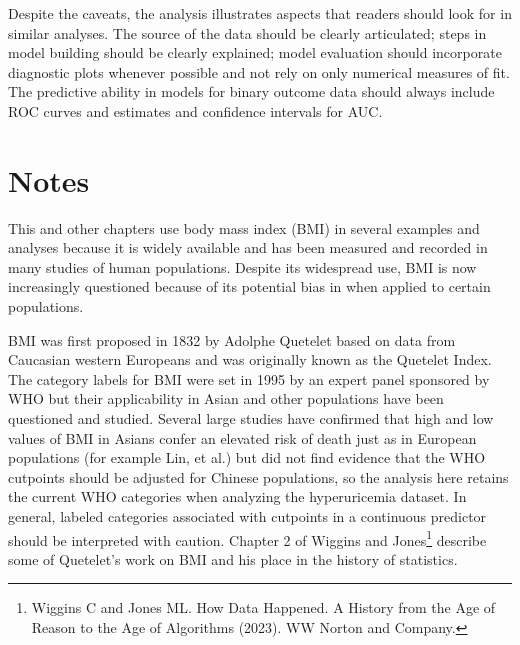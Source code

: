 Despite the caveats, the analysis illustrates aspects that readers should look for in similar analyses. The source of the data should be clearly articulated; steps in model building should be clearly explained; model evaluation should incorporate diagnostic plots whenever  possible and not rely on only numerical  measures of fit.  The predictive ability in models for binary outcome data should always include ROC curves and estimates and confidence intervals for AUC.

\textD{\newpage}

\section{Notes}
\label{notesLogisticRegression}

This and other chapters use body mass index (BMI) in several examples and analyses because it is widely available and has been measured and recorded in many studies of human populations. Despite its widespread use, BMI is now increasingly questioned because of its potential bias in when applied to certain populations.

BMI was first proposed in 1832 by Adolphe Quetelet based on data from Caucasian western Europeans and was originally known as the Quetelet Index. The category labels for BMI were set in 1995 by an expert panel sponsored by WHO but their applicability in Asian and other populations have been questioned and studied.  Several large studies have confirmed that high and low values of BMI in Asians confer an elevated risk of death just as in European populations (for example Lin, et al.) but did not find evidence that the WHO cutpoints should be adjusted for Chinese populations, so the analysis here retains the current WHO categories when analyzing the hyperuricemia dataset.  In general, labeled categories associated with cutpoints in a continuous predictor should be interpreted with caution.  Chapter 2 of Wiggins and Jones\footnote{Wiggins C and Jones ML.  How Data Happened.  A History from the Age of Reason to the Age of Algorithms (2023).  WW Norton and Company.} describe some of Quetelet's work on BMI and his place in the history of statistics.

